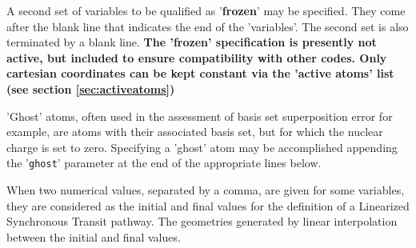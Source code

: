 A second set of variables to be qualified as '{\bf frozen}' may be
specified.  They come  after  the  blank  line  that indicates the end
of the 'variables'. The second set is also terminated by a blank line.
{\bf The 'frozen' specification is presently not active, but included
  to ensure compatibility with other codes. Only cartesian coordinates
  can be kept constant via the 'active atoms' list (see section
  \ref{sec:activeatoms})}

'Ghost' atoms, often used in the assessment of basis set superposition
error for  example,  are  atoms  with their associated basis set, but
for which the nuclear charge is set to zero. Specifying a 'ghost' atom
may be  accomplished appending the '{\tt ghost}' parameter at the end of the
appropriate lines below.

When  two  numerical  values,  separated by a comma, are given for some
variables, they are considered as the initial and final values for the
definition of a Linearized Synchronous Transit pathway.  The
geometries generated by linear interpolation between the initial and
final values.


